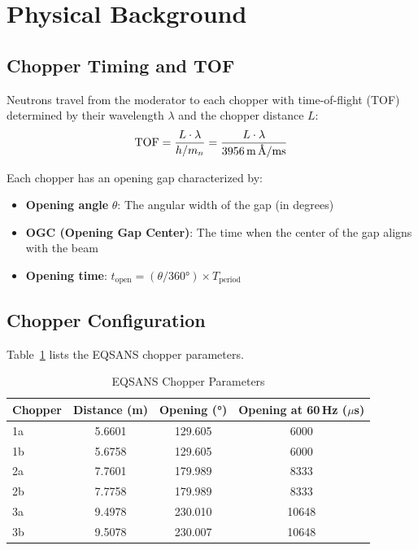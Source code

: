 \documentclass[11pt,letterpaper]{article}
\begin{document}
\section{Physical Background}

\subsection{Chopper Timing and TOF}

Neutrons travel from the moderator to each chopper with time-of-flight (TOF) determined by their 
wavelength $\lambda$ and the chopper distance $L$:
\begin{equation}
    \text{TOF} = \frac{L \cdot \lambda}{h/m_n} = \frac{L \cdot \lambda}{3956\,\text{m\,\AA/ms}}
\end{equation}

Each chopper has an opening gap characterized by:
\begin{itemize}
    \item \textbf{Opening angle} $\theta$: The angular width of the gap (in degrees)
    \item \textbf{OGC (Opening Gap Center)}: The time when the center of the gap aligns with the beam
    \item \textbf{Opening time}: $t_{\text{open}} = (\theta/360°) \times T_{\text{period}}$
\end{itemize}

\subsection{Chopper Configuration}

Table~\ref{tab:choppers} lists the EQSANS chopper parameters.

\begin{table}[h]
\centering
\caption{EQSANS Chopper Parameters}
\label{tab:choppers}
\begin{tabular}{lccc}
\toprule
Chopper & Distance (m) & Opening (°) & Opening at 60\,Hz ($\mu$s) \\
\midrule
1a & 5.6601 & 129.605 & 6000 \\
1b & 5.6758 & 129.605 & 6000 \\
2a & 7.7601 & 179.989 & 8333 \\
2b & 7.7758 & 179.989 & 8333 \\
3a & 9.4978 & 230.010 & 10648 \\
3b & 9.5078 & 230.007 & 10648 \\
\bottomrule
\end{tabular}
\end{table}
\end{document}

